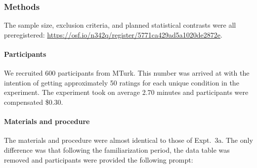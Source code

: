 \documentclass[floatsintext,man]{apa6}
\let\oldparagraph\paragraph
\renewcommand{\paragraph}[1]{\oldparagraph{#1}\mbox{}}
\let\rmarkdownfootnote\footnote%
\def\footnote{\protect\rmarkdownfootnote}
\begin{document}

\hypertarget{methods-3}{%
\subsubsection{Methods}\label{methods-3}}

The sample size, exclusion criteria, and planned statistical contrasts were all preregistered: \url{https://osf.io/n342q/register/5771ca429ad5a1020de2872e}.

\hypertarget{participants-4}{%
\paragraph{Participants}\label{participants-4}}
%
We recruited 600 participants from MTurk.
This number was arrived at with the intention of getting approximately 50 ratings for each unique condition in the experiment.
The experiment took on average 2.70 minutes and participants were compensated \$0.30.

\hypertarget{materials-and-procedure}{%
\paragraph{Materials and procedure}\label{materials-and-procedure}}
%
The materials and procedure were almost identical to those of Expt.~3a.
The only difference was that following the familiarization period, the data table was removed and participants were provided the following prompt:
\end{document}
